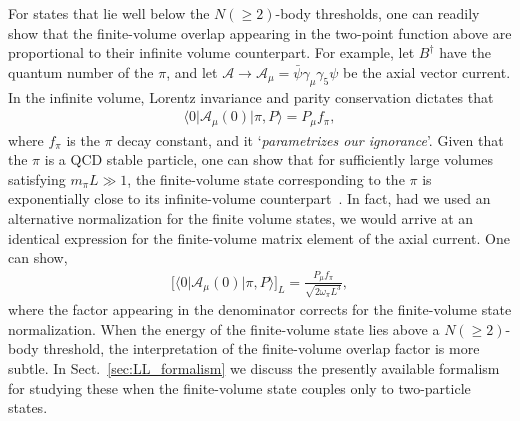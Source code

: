 \documentclass{iopart}
\theoremstyle{definition}
\begin{document}
{For states that lie well below the $N(\geq2)$-body thresholds, one can readily show that the  finite-volume overlap appearing in the two-point function above are proportional to their infinite volume counterpart. For example, let $B^\dagger$ have the quantum number of the $\pi$, and let $\mathcal A\to \mathcal A_\mu=\bar{\psi}\gamma_\mu\gamma_5\psi$ be the axial vector current. In the infinite volume, Lorentz invariance and parity conservation dictates that
\begin{eqnarray}
\label{eq:fpi}
\langle 0 \vert  \mathcal A_\mu(0)  \vert \pi, P \rangle 
=P_\mu f_\pi,
\end{eqnarray}
where $f_\pi$ is the $\pi$ decay constant, and it  `\emph{parametrizes our ignorance}'. Given that the $\pi$ is a QCD stable particle, one can show that for sufficiently large volumes satisfying $m_\pi L \gg 1$, the finite-volume state corresponding to the $\pi$ is exponentially close to its infinite-volume counterpart~\cite{Luscher:1985dn}. In fact, had we used an alternative normalization for the finite volume states, we would arrive at an identical expression for the finite-volume matrix element of the axial current. One can show, 
\begin{eqnarray}
\label{eq:fpi_L}
\big[\langle 0 \vert  \mathcal A_\mu(0)  \vert \pi, P \rangle\big] _L
=\frac{P_\mu f_\pi}{\sqrt{2\omega_\pi L^3}},
\end{eqnarray}
where the factor appearing in the denominator corrects for the finite-volume state normalization. When the energy of the finite-volume state lies above a $N(\geq2)$-body threshold, the interpretation of the finite-volume overlap factor is more subtle. In Sect.~\ref{sec:LL_formalism} we discuss the presently available formalism for studying these when the finite-volume state couples only to two-particle states. 


}
\end{document}
